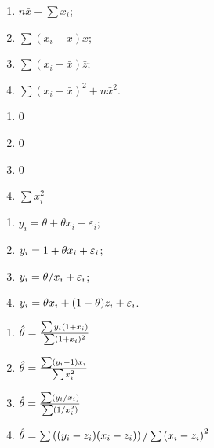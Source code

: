\begin{problem}
\begin{enumerate}
\item $n\bar x - \sum x_i$;
\item $\sum (x_i - \bar x)\bar x$;
\item $\sum (x_i - \bar x)\bar z$;
\item $\sum (x_i - \bar x)^2 + n \bar{x}^2$.
\end{enumerate}

\begin{sol}
\begin{enumerate}
\item $0$
\item $0$
\item $0$
\item $\sum x_i^2$
\end{enumerate}
\end{sol}
\end{problem}


\begin{problem}

\begin{enumerate}
\item $y_i = \theta + \theta x_i + \varepsilon_i$;
\item $y_i = 1 + \theta x_i + \varepsilon_i$;
\item $y_i = \theta / x_i + \varepsilon_i$;
\item $y_i = \theta x_i + (1-\theta)z_i+\varepsilon_i$.
\end{enumerate}

\begin{sol}
\begin{enumerate}
\item $\hat{\theta} = \frac{\sum y_i (1 + x_i)}{\sum (1 + x_i)^2}$
\item $\hat{\theta} = \frac{\sum (y_i - 1) x_i}{\sum x_i^2}$
\item $\hat{\theta} = \frac{\sum (y_i / x_i)}{\sum (1 / x_i^2)}$
\item $\hat{\theta} = \sum \left((y_i - z_i)(x_i - z_i) \right) / \sum \left(x_i - z_i\right)^2$
\end{enumerate}
\end{sol}
\end{problem}

